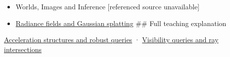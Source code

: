 \begin{itemize}
\item
  {Worlds, Images and Inference {[}referenced source unavailable{]}}
\item
  \hyperref[appendix-c5b332e400e7]{Radiance fields and Gaussian splatting} \#\# Full teaching explanation
\end{itemize}

\hyperref[04-visual-computing-ii-ch029-acceleration-structures-and-robust-queries-1]{Acceleration structures and robust queries} · \hyperref[04-visual-computing-ii-ch028-visibility-queries-and-ray-intersections-1]{Visibility queries and ray intersections}
